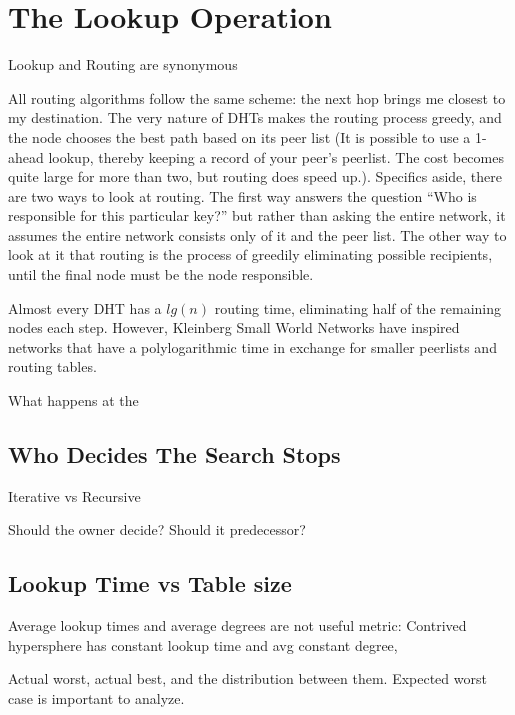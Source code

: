 \documentclass[10pt,letterpaper]{report}
\begin{document}
\section{The Lookup Operation} 

Lookup and Routing are synonymous

All routing algorithms follow the same scheme:  the next hop  brings me closest to my destination.  The very nature of DHTs makes the routing process greedy, and the node chooses the best path based on its peer list (It is possible to use a 1-ahead lookup, thereby keeping a record of your peer's peerlist.  The cost becomes quite large for more than two, but routing does speed up.).  Specifics aside, there are two ways to look at routing.  The first way  answers the question ``Who is responsible for this particular key?''  but rather than asking the entire network, it assumes the entire network consists only of it and the peer list.  The other way to look at it that routing is the process of greedily  eliminating possible recipients, until the final node must be the node responsible.  

Almost every DHT has a $lg(n)$ routing time, eliminating  half of the remaining nodes each step.
However, Kleinberg Small World Networks have inspired networks that have a polylogarithmic time in exchange for smaller peerlists and routing tables.

What happens at the 


\subsection{Who Decides The Search Stops}
Iterative vs Recursive

Should the owner decide?  Should it predecessor?

\subsection{Lookup Time vs Table size}

Average lookup times and average degrees are not useful metric:
Contrived hypersphere has constant lookup time and avg constant degree,



Actual worst, actual best, and the distribution between them.  Expected worst case is important to analyze.

\subsection{}
\end{document}
